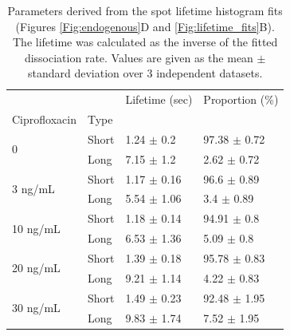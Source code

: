 \begin{table}[htbp]
    \centering
    \begin{tabular}{llll}
        \toprule
         &  & Lifetime (sec) & Proportion (\%) \\
        Ciprofloxacin & Type &  &  \\
        \midrule
        \multirow[t]{2}{*}{0} & Short & 1.24 $\pm$ 0.2 & 97.38 $\pm$ 0.72 \\
         & Long & 7.15 $\pm$ 1.2 & 2.62 $\pm$ 0.72 \\
        \cline{1-4}
        \multirow[t]{2}{*}{3 ng/mL} & Short & 1.17 $\pm$ 0.16 & 96.6 $\pm$ 0.89 \\
         & Long & 5.54 $\pm$ 1.06 & 3.4 $\pm$ 0.89 \\
        \cline{1-4}
        \multirow[t]{2}{*}{10 ng/mL} & Short & 1.18 $\pm$ 0.14 & 94.91 $\pm$ 0.8 \\
         & Long & 6.53 $\pm$ 1.36 & 5.09 $\pm$ 0.8 \\
        \cline{1-4}
        \multirow[t]{2}{*}{20 ng/mL} & Short & 1.39 $\pm$ 0.18 & 95.78 $\pm$ 0.83 \\
         & Long & 9.21 $\pm$ 1.14 & 4.22 $\pm$ 0.83 \\
        \cline{1-4}
        \multirow[t]{2}{*}{30 ng/mL} & Short & 1.49 $\pm$ 0.23 & 92.48 $\pm$ 1.95 \\
         & Long & 9.83 $\pm$ 1.74 & 7.52 $\pm$ 1.95 \\
        \bottomrule
        \end{tabular}
    \caption{Parameters derived from the spot lifetime histogram fits (Figures \ref{Fig:endogenous}D and \ref{Fig:lifetime_fits}B). The lifetime was calculated as the inverse of the fitted dissociation rate. Values are given as the mean $\pm$ standard deviation over 3 independent datasets.}
    \label{tab:fit_results}
\end{table}

